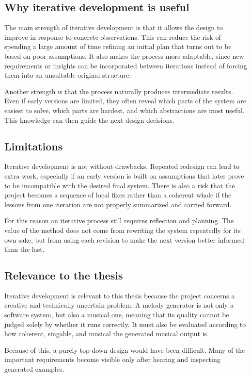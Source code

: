 \subsection{Why iterative development is useful}

  The main strength of iterative development is that it allows the design to improve in response to concrete observations. This can reduce the risk of spending a large amount of time refining an initial plan that turns out to be based on poor assumptions. It also makes the process more adaptable, since new requirements or insights can be incorporated between iterations instead of forcing them into an unsuitable original structure.

  Another strength is that the process naturally produces intermediate results. Even if early versions are limited, they often reveal which parts of the system are easiest to solve, which parts are hardest, and which abstractions are most useful. This knowledge can then guide the next design decisions.

\subsection{Limitations}

  Iterative development is not without drawbacks. Repeated redesign can lead to extra work, especially if an early version is built on assumptions that later prove to be incompatible with the desired final system. There is also a risk that the project becomes a sequence of local fixes rather than a coherent whole if the lessons from one iteration are not properly summarized and carried forward.

  For this reason an iterative process still requires reflection and planning. The value of the method does not come from rewriting the system repeatedly for its own sake, but from using each revision to make the next version better informed than the last.

\subsection{Relevance to the thesis}

  Iterative development is relevant to this thesis because the project concerns a creative and technically uncertain problem. A melody generator is not only a software system, but also a musical one, meaning that its quality cannot be judged solely by whether it runs correctly. It must also be evaluated according to how coherent, singable, and musical the generated musical output is.

  Because of this, a purely top-down design would have been difficult. Many of the important requirements become visible only after hearing and inspecting generated examples.
